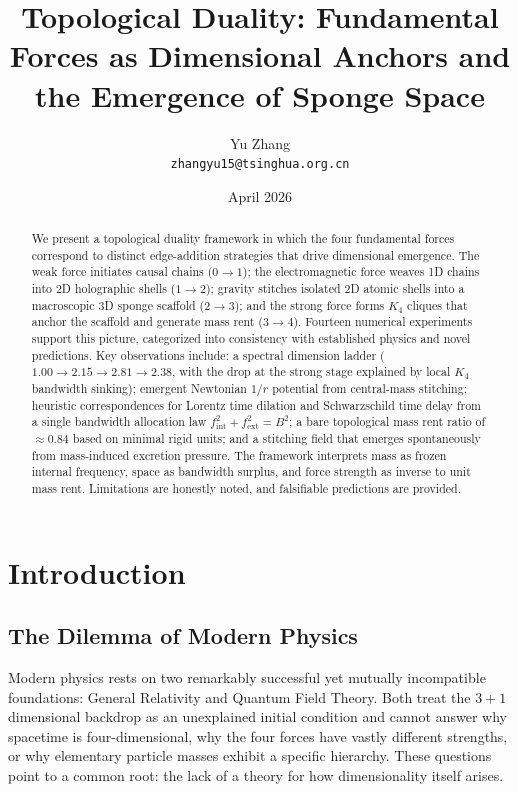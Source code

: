 \documentclass[12pt,a4paper]{article}
\title{Topological Duality: Fundamental Forces as Dimensional Anchors and the Emergence of Sponge Space}
\author{Yu Zhang\\ \texttt{zhangyu15@tsinghua.org.cn}}
\date{April 2026}
\begin{document}
\maketitle

\begin{abstract}
We present a topological duality framework in which the four fundamental forces correspond to distinct edge-addition strategies that drive dimensional emergence. The weak force initiates causal chains ($0\to1$); the electromagnetic force weaves 1D chains into 2D holographic shells ($1\to2$); gravity stitches isolated 2D atomic shells into a macroscopic 3D sponge scaffold ($2\to3$); and the strong force forms $K_4$ cliques that anchor the scaffold and generate mass rent ($3\to4$). Fourteen numerical experiments support this picture, categorized into consistency with established physics and novel predictions. Key observations include: a spectral dimension ladder ($1.00\to2.15\to2.81\to2.38$, with the drop at the strong stage explained by local $K_4$ bandwidth sinking); emergent Newtonian $1/r$ potential from central-mass stitching; heuristic correspondences for Lorentz time dilation and Schwarzschild time delay from a single bandwidth allocation law $f_{\text{int}}^2+f_{\text{ext}}^2=B^2$; a bare topological mass rent ratio of $\approx0.84$ based on minimal rigid units; and a stitching field that emerges spontaneously from mass-induced excretion pressure. The framework interprets mass as frozen internal frequency, space as bandwidth surplus, and force strength as inverse to unit mass rent. Limitations are honestly noted, and falsifiable predictions are provided.
\end{abstract}

\section{Introduction}

\subsection{The Dilemma of Modern Physics}
Modern physics rests on two remarkably successful yet mutually incompatible foundations: General Relativity and Quantum Field Theory. Both treat the $3+1$ dimensional backdrop as an unexplained initial condition and cannot answer why spacetime is four-dimensional, why the four forces have vastly different strengths, or why elementary particle masses exhibit a specific hierarchy. These questions point to a common root: the lack of a theory for how dimensionality itself arises.
\end{document}
